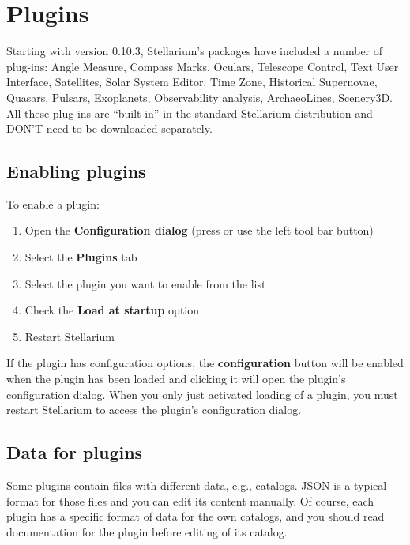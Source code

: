 
\chapter{Plugins}
\label{ch:Plugins}

Starting with version 0.10.3, Stellarium's packages have included a number of
plug-ins: Angle Measure, Compass Marks, Oculars, Telescope Control, Text
User Interface, Satellites, Solar System Editor, Time Zone, Historical
Supernovae, Quasars, Pulsars, Exoplanets, Observability analysis, ArchaeoLines, Scenery3D. All
these plug-ins are ``built-in'' in the standard Stellarium distribution
and DON'T need to be downloaded separately.


\section{Enabling plugins}
\label{sec:Plugins:EnablingPlugins}


To enable a plugin:

\begin{enumerate}
\item
  Open the \textbf{Configuration dialog} (press  or use the left tool
  bar button)
\item
  Select the \textbf{Plugins} tab
\item
  Select the plugin you want to enable from the list
\item
  Check the \textbf{Load at startup} option
\item
  Restart Stellarium
\end{enumerate}

If the plugin has configuration options, the \textbf{configuration}
button will be enabled when the plugin has been loaded and clicking it
will open the plugin's configuration dialog. When you only just
activated loading of a plugin, you must restart Stellarium to access
the plugin's configuration dialog.

\section{Data for plugins}
\label{sec:Plugins:DataForPlugins}

Some plugins contain files with different data, e.g., catalogs. JSON is a
typical format for those files and you can edit its content manually. Of
course, each plugin has a specific format of data for the own catalogs, and
you should read documentation for the plugin before editing of its catalog.

